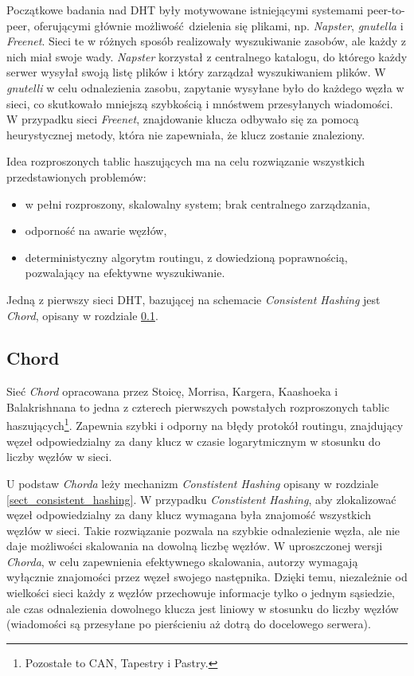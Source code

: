 \documentclass[a4paper,11pt]{scrartcl}
\begin{document}
Początkowe badania nad DHT były motywowane istniejącymi systemami peer-to-peer, oferującymi głównie możliwość dzielenia się plikami, np. \textit{Napster}, \textit{gnutella} i \textit{Freenet}. Sieci te w różnych sposób realizowały wyszukiwanie zasobów, ale każdy z nich miał swoje wady. \textit{Napster} korzystał z centralnego katalogu, do którego każdy serwer wysyłał swoją listę plików i który zarządzał wyszukiwaniem plików. W \textit{gnutelli} w celu odnalezienia zasobu, zapytanie wysyłane było do każdego węzła w sieci, co skutkowało mniejszą szybkością i mnóstwem przesyłanych wiadomości. W przypadku sieci \textit{Freenet}, znajdowanie klucza odbywało się za pomocą heurystycznej metody, która nie zapewniała, że klucz zostanie znaleziony.

Idea rozproszonych tablic haszujących ma na celu rozwiązanie wszystkich przedstawionych problemów:
\begin{itemize}
  \item w pełni rozproszony, skalowalny system; brak centralnego zarządzania,
  \item odporność na awarie węzłów,
  \item deterministyczny algorytm routingu, z dowiedzioną poprawnością, pozwalający na efektywne wyszukiwanie. 
\end{itemize} 

Jedną z pierwszy sieci DHT, bazującej na schemacie \textit{Consistent Hashing} jest \textit{Chord}, opisany w rozdziale \ref{sect_dht_chord}.

\subsection{Chord}
\label{sect_dht_chord}
Sieć \textit{Chord} opracowana przez Stoicę, Morrisa, Kargera, Kaashoeka i Balakrishnana  \cite{stoica2001chord} to jedna z czterech pierwszych powstałych rozproszonych tablic haszujących\footnote{Pozostałe to CAN\cite{ratnasamy2001scalable}, Tapestry \cite{zhao2001tapestry} i Pastry\cite{rowstron2001pastry}.}. Zapewnia szybki i odporny na błędy protokół routingu, znajdujący węzeł odpowiedzialny za dany klucz w czasie logarytmicznym w stosunku do liczby węzłów w sieci.

U podstaw \textit{Chorda} leży mechanizm \textit{Constistent Hashing} opisany w rozdziale \ref{sect_consistent_hashing}. W przypadku \textit{Constistent Hashing}, aby zlokalizować węzeł odpowiedzialny za dany klucz wymagana była znajomość wszystkich węzłów w sieci. Takie rozwiązanie pozwala na szybkie odnalezienie węzła, ale nie daje możliwości skalowania na dowolną liczbę węzłów. W uproszczonej wersji \textit{Chorda}, w celu zapewnienia efektywnego skalowania, autorzy wymagają wyłącznie znajomości przez węzeł swojego następnika. Dzięki temu, niezależnie od wielkości sieci każdy z węzłów przechowuje informacje tylko o jednym sąsiedzie, ale czas odnalezienia dowolnego klucza jest liniowy w stosunku do liczby węzłów (wiadomości są przesyłane po pierścieniu aż dotrą do docelowego serwera).
\end{document}
